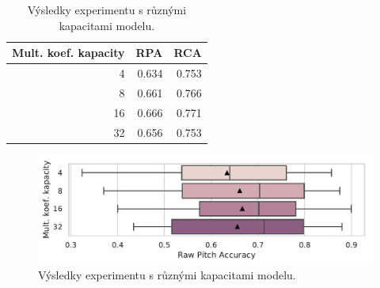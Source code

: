 \begin{table}[h!]

\centering

\begin{tabular}{rrr}
\toprule
Mult. koef. kapacity &   RPA &   RCA \\
\midrule
                   4 & 0.634 & 0.753 \\
                   8 & 0.661 & 0.766 \\
                  16 & 0.666 & 0.771 \\
                  32 & 0.656 & 0.753 \\
\bottomrule
\end{tabular}
\caption{Výsledky experimentu s různými kapacitami modelu.}\label{tab:crepe_capacity}
\end{table}

\begin{figure}[h]\centering
    \includegraphics[scale=0.6]{../img/figures/crepe_kapacita.pdf}
\caption{Výsledky experimentu s různými kapacitami modelu.}
\label{obr:crepe_capacity}
\end{figure}

